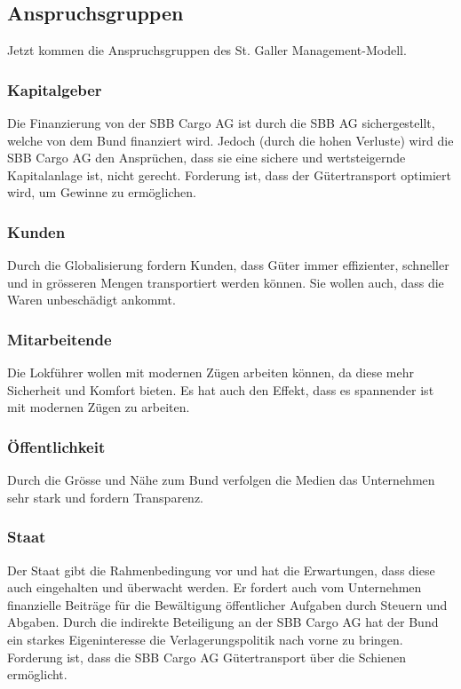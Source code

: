 \documentclass{article}
\begin{document}
\subsection{Anspruchsgruppen}

Jetzt kommen die Anspruchsgruppen des St. Galler Management-Modell.

\subsubsection{Kapitalgeber}
Die Finanzierung von der SBB Cargo AG ist durch die SBB AG sichergestellt, welche von dem Bund finanziert wird.
Jedoch (durch die hohen Verluste) wird die SBB Cargo AG den Ansprüchen, dass sie eine sichere und wertsteigernde Kapitalanlage ist, nicht gerecht.
Forderung ist, dass der Gütertransport optimiert wird, um Gewinne zu ermöglichen.

\subsubsection{Kunden}
Durch die Globalisierung fordern Kunden, dass Güter immer effizienter, schneller und in grösseren Mengen transportiert werden können.
Sie wollen auch, dass die Waren unbeschädigt ankommt.

\subsubsection{Mitarbeitende}
Die Lokführer wollen mit modernen Zügen arbeiten können, da diese mehr Sicherheit und Komfort bieten.
Es hat auch den Effekt, dass es spannender ist mit modernen Zügen zu arbeiten. 

\subsubsection{Öffentlichkeit}
Durch die Grösse und Nähe zum Bund verfolgen die Medien das Unternehmen sehr stark und fordern Transparenz.

\subsubsection{Staat}
Der Staat gibt die Rahmenbedingung vor und hat die Erwartungen, dass diese auch eingehalten und überwacht werden.
Er fordert auch vom Unternehmen finanzielle Beiträge für die Bewältigung öffentlicher Aufgaben durch Steuern und Abgaben.
Durch die indirekte Beteiligung an der SBB Cargo AG hat der Bund ein starkes Eigeninteresse die Verlagerungspolitik nach vorne zu bringen.
Forderung ist, dass die SBB Cargo AG Gütertransport über die Schienen ermöglicht.
\end{document}
